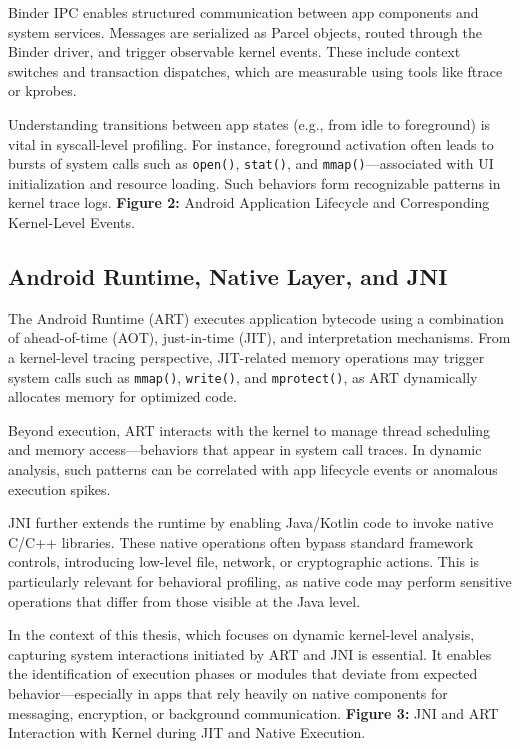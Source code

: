 \documentclass[a4paper,12pt]{report}
\begin{document}
Binder IPC enables structured communication between app components and system services. Messages are serialized as Parcel objects, routed through the Binder driver, and trigger observable kernel events. These include context switches and transaction dispatches, which are measurable using tools like ftrace or kprobes.

Understanding transitions between app states (e.g., from idle to foreground) is vital in syscall-level profiling. For instance, foreground activation often leads to bursts of system calls such as \texttt{open()}, \texttt{stat()}, and \texttt{mmap()}—associated with UI initialization and resource loading. Such behaviors form recognizable patterns in kernel trace logs.
\textbf{Figure 2:} Android Application Lifecycle and Corresponding Kernel-Level Events.

\subsection{Android Runtime, Native Layer, and JNI}
The Android Runtime (ART) executes application bytecode using a combination of ahead-of-time (AOT), just-in-time (JIT), and interpretation mechanisms. From a kernel-level tracing perspective, JIT-related memory operations may trigger system calls such as \texttt{mmap()}, \texttt{write()}, and \texttt{mprotect()}, as ART dynamically allocates memory for optimized code.

Beyond execution, ART interacts with the kernel to manage thread scheduling and memory access—behaviors that appear in system call traces. In dynamic analysis, such patterns can be correlated with app lifecycle events or anomalous execution spikes.

JNI further extends the runtime by enabling Java/Kotlin code to invoke native C/C++ libraries. These native operations often bypass standard framework controls, introducing low-level file, network, or cryptographic actions. This is particularly relevant for behavioral profiling, as native code may perform sensitive operations that differ from those visible at the Java level.

In the context of this thesis, which focuses on dynamic kernel-level analysis, capturing system interactions initiated by ART and JNI is essential. It enables the identification of execution phases or modules that deviate from expected behavior—especially in apps that rely heavily on native components for messaging, encryption, or background communication.
\textbf{Figure 3:} JNI and ART Interaction with Kernel during JIT and Native Execution.
\end{document}

